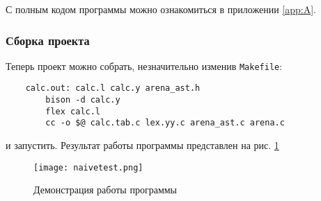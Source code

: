 С полным кодом программы можно ознакомиться в приложении \ref{app:A}.

\subsubsection{Сборка проекта}
Теперь проект можно собрать, незначительно изменив \texttt{Makefile}:
\begin{verbatim}
    calc.out: calc.l calc.y arena_ast.h
        bison -d calc.y
        flex calc.l
        cc -o $@ calc.tab.c lex.yy.c arena_ast.c arena.c
\end{verbatim}
и запустить. Результат работы программы представлен на рис. \ref{img:demon}
\begin{figure}[H]
    \centering
    \texttt{[image: naivetest.png]}
    \caption{Демонстрация работы программы}
    \label{img:demon}
\end{figure}    
